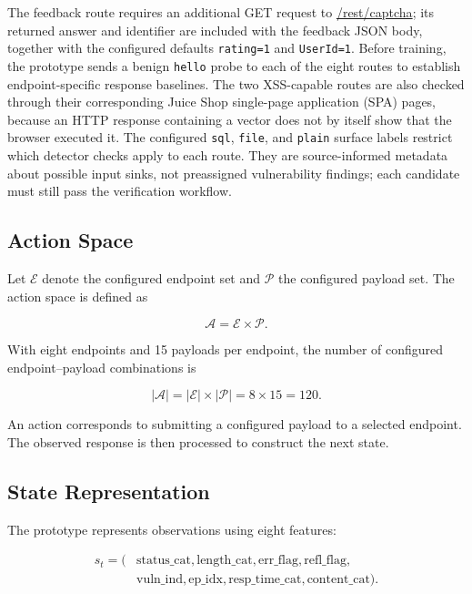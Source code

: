 \documentclass[conference]{IEEEtran}
\begin{document}
The feedback route requires an additional GET request to
\url{/rest/captcha}; its returned answer and identifier are
included with the feedback JSON body, together with the
configured defaults \texttt{rating=1} and \texttt{UserId=1}.
Before training,
the prototype sends a benign \texttt{hello} probe to each of
the eight routes to establish endpoint-specific response
baselines. The two XSS-capable routes are also checked through
their corresponding Juice Shop single-page application (SPA)
pages, because an HTTP response containing a vector does not
by itself show that the browser executed it.
The configured \texttt{sql}, \texttt{file}, and \texttt{plain}
surface labels restrict which detector checks apply to each
route. They are source-informed metadata about possible input
sinks, not preassigned vulnerability findings; each candidate
must still pass the verification workflow.

\subsection{Action Space}

Let $\mathcal{E}$ denote the configured endpoint set and
$\mathcal{P}$ the configured payload set. The action space
is defined as

\begin{equation}
\mathcal{A} = \mathcal{E} \times \mathcal{P}.
\label{eq:actionspace}
\end{equation}

With eight endpoints and 15 payloads per endpoint, the
number of configured endpoint--payload combinations is

\begin{equation}
|\mathcal{A}| = |\mathcal{E}| \times |\mathcal{P}|
= 8 \times 15 = 120.
\label{eq:actioncount}
\end{equation}

An action corresponds to submitting a configured payload
to a selected endpoint. The observed response is then
processed to construct the next state.

\subsection{State Representation}

The prototype represents observations using eight features:

\begin{equation}
\begin{split}
s_t = (&\text{status\_cat},
\text{length\_cat},
\text{err\_flag},
\text{refl\_flag},\\
&\text{vuln\_ind},
\text{ep\_idx},
\text{resp\_time\_cat},
\text{content\_cat}).
\end{split}
\label{eq:state}
\end{equation}
\end{document}
